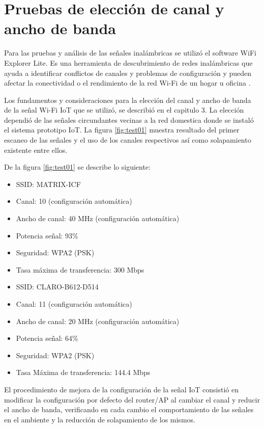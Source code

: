 
\section{Pruebas de elección de canal y ancho de banda}
Para las pruebas y análisis de las señales inalámbricas se utilizó el software WiFi Explorer Lite. Es una herramienta de descubrimiento de redes inalámbricas que ayuda a identificar conflictos de canales y problemas de configuración y  pueden afectar la conectividad o el rendimiento de la red Wi-Fi de un hogar u oficina \citep{WEBSITE:24}. 

Los fundamentos y consideraciones para la elección del canal y ancho de banda de la señal Wi-Fi IoT que se utilizó, se describió en el capitulo 3. La elección dependió de las señales circundantes vecinas a la red domestica donde se instaló el sistema prototipo IoT. La figura \ref{fig:test01} muestra resultado del primer escaneo de las señales y el uso de los canales respectivos así como solapamiento existente entre ellos. 

De la figura \ref{fig:test01} se describe lo siguiente:

\begin{itemize}
\item SSID: MATRIX-ICF
\item Canal: 10 (configuración automática)
\item Ancho de canal: 40 MHz (configuración automática)
\item Potencia señal: 93\%
\item Seguridad:  WPA2 (PSK)
\item Tasa máxima de transferencia: 300 Mbps
\end{itemize}


\begin{itemize} 
\item SSID: CLARO-B612-D514
\item Canal: 11 (configuración automática)
\item Ancho de canal: 20 MHz (configuración automática)
\item Potencia señal: 64\%
\item Seguridad: WPA2 (PSK)
\item Tasa Máxima de transferencia: 144.4 Mbps
\end{itemize}

El procedimiento de mejora de la configuración de la señal IoT consistió en modificar la configuración por defecto del router/AP al cambiar el canal y reducir el ancho de banda, verificando en cada cambio el comportamiento de las señales en el ambiente y la reducción de solapamiento de los mismos.

